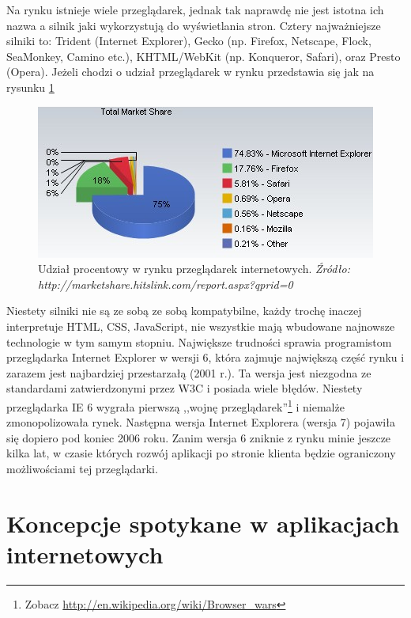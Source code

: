 \documentclass[a4paper,12pt,oneside]{report}
\begin{document}
Na rynku istnieje wiele przeglądarek, jednak tak naprawdę nie jest istotna ich nazwa a silnik jaki wykorzystują do wyświetlania stron. Cztery najważniejsze silniki to: Trident (Internet Explorer), Gecko (np. Firefox, Netscape, Flock, SeaMonkey, Camino etc.), KHTML/WebKit (np. Konqueror, Safari), oraz Presto (Opera). Jeżeli chodzi o udział przeglądarek w rynku przedstawia się jak na rysunku \ref{fig:przegladarki}
\begin{figure}[h]
\centering
  \includegraphics{browsers.png}
  \caption{
  Udział procentowy w rynku przeglądarek internetowych.\newline
  \emph{Źródło: http://marketshare.hitslink.com/report.aspx?qprid=0}
  \label{fig:przegladarki}
  }
\end{figure}

Niestety silniki nie są ze sobą ze sobą kompatybilne, każdy trochę inaczej interpretuje HTML, CSS, JavaScript, nie wszystkie mają wbudowane najnowsze technologie w tym samym stopniu. Największe trudności sprawia programistom przeglądarka Internet Explorer w wersji 6, która zajmuje największą część rynku i zarazem jest najbardziej przestarzałą (2001 r.).  Ta wersja jest niezgodna ze standardami zatwierdzonymi przez W3C i posiada wiele błędów. Niestety przeglądarka IE 6 wygrała pierwszą ,,wojnę przeglądarek''\footnote{Zobacz \url{http://en.wikipedia.org/wiki/Browser_wars}} i niemalże zmonopolizowała rynek. Następna wersja Internet Explorera (wersja 7) pojawiła się dopiero pod koniec 2006 roku. Zanim wersja 6 zniknie z rynku minie jeszcze kilka lat, w czasie których rozwój aplikacji po stronie klienta będzie ograniczony możliwościami tej przeglądarki.

\chapter[Rozwiązania koncepcyjne]{Koncepcje spotykane w aplikacjach internetowych}
\label{cha:koncepcje}
\end{document}
